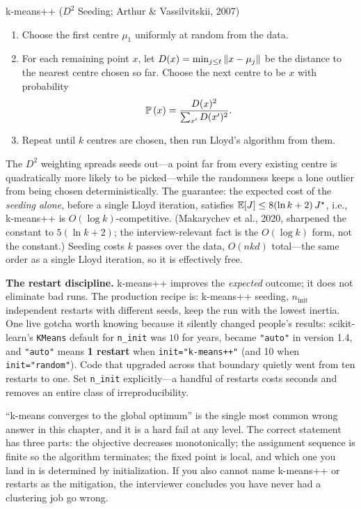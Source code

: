 \begin{mathresult}{k-means++ ($D^2$ Seeding; Arthur \& Vassilvitskii, 2007)}
\begin{enumerate}
    \item Choose the first centre $\mu_1$ uniformly at random from the data.
    \item For each remaining point $x$, let $D(x) = \min_{j \le t} \left\lVert x - \mu_j\right\rVert$ be the distance to the nearest centre chosen so far. Choose the next centre to be $x$ with probability
    \begin{equation}
    \mathbb{P}\left(x\right) = \frac{D(x)^2}{\sum_{x'} D(x')^2}.
    \end{equation}
    \item Repeat until $k$ centres are chosen, then run Lloyd's algorithm from them.
\end{enumerate}
The $D^2$ weighting spreads seeds out---a point far from every existing centre is quadratically more likely to be picked---while the randomness keeps a lone outlier from being chosen deterministically. The guarantee: the expected cost of the \emph{seeding alone}, before a single Lloyd iteration, satisfies $\operatorname{\mathbb{E}}[J] \le 8(\ln k + 2)\, J^\star$, i.e., k-means++ is $O(\log k)$-competitive. (Makarychev et al., 2020, sharpened the constant to $5(\ln k + 2)$; the interview-relevant fact is the $O(\log k)$ form, not the constant.) Seeding costs $k$ passes over the data, $O(nkd)$ total---the same order as a single Lloyd iteration, so it is effectively free.
\end{mathresult}

\textbf{The restart discipline.} k-means++ improves the \emph{expected} outcome; it does not eliminate bad runs. The production recipe is: k-means++ seeding, $n_{\text{init}}$ independent restarts with different seeds, keep the run with the lowest inertia. One live gotcha worth knowing because it silently changed people's results: scikit-learn's \texttt{KMeans} default for \texttt{n\_init} was $10$ for years, became \texttt{"auto"} in version 1.4, and \texttt{"auto"} means \textbf{1 restart} when \texttt{init="k-means++"} (and 10 when \texttt{init="random"}). Code that upgraded across that boundary quietly went from ten restarts to one. Set \texttt{n\_init} explicitly---a handful of restarts costs seconds and removes an entire class of irreproducibility.

\begin{warningbox}
``k-means converges to the global optimum'' is the single most common wrong answer in this chapter, and it is a hard fail at any level. The correct statement has three parts: the objective decreases monotonically; the assignment sequence is finite so the algorithm terminates; the fixed point is local, and which one you land in is determined by initialization. If you also cannot name k-means++ or restarts as the mitigation, the interviewer concludes you have never had a clustering job go wrong.
\end{warningbox}

